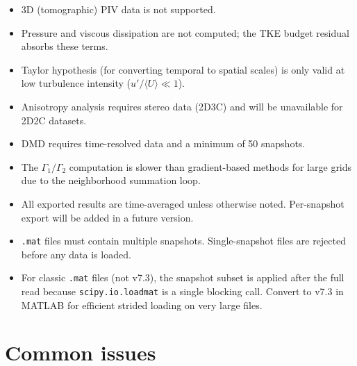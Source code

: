 \documentclass[11pt, a4paper]{report}
\begin{document}
\begin{itemize}[leftmargin=1.5em]
  \item 3D (tomographic) PIV data is not supported.
  \item Pressure and viscous dissipation are not computed; the TKE budget residual absorbs these terms.
  \item Taylor hypothesis (for converting temporal to spatial scales) is only valid at low turbulence intensity ($u'/\langle U\rangle \ll 1$).
  \item Anisotropy analysis requires stereo data (2D3C) and will be unavailable for 2D2C datasets.
  \item DMD requires time-resolved data and a minimum of 50 snapshots.
  \item The $\Gamma_1/\Gamma_2$ computation is slower than gradient-based methods for large grids due to the neighborhood summation loop.
  \item All exported results are time-averaged unless otherwise noted. Per-snapshot export will be added in a future version.
  \item \texttt{.mat} files must contain multiple snapshots. Single-snapshot files are rejected before any data is loaded.
  \item For classic \texttt{.mat} files (not v7.3), the snapshot subset is applied after the full read because \texttt{scipy.io.loadmat} is a single blocking call. Convert to v7.3 in MATLAB for efficient strided loading on very large files.
\end{itemize}

\section{Common issues}
\end{document}
